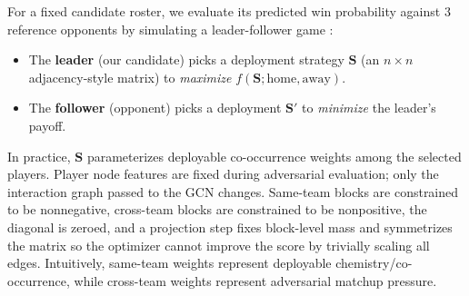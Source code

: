 \documentclass[11pt,letterpaper]{article}
\begin{document}
For a fixed candidate roster, we evaluate its predicted win probability
against $3$ reference opponents by simulating a leader-follower game
\citep{conitzer2006commit}:

\begin{itemize}[leftmargin=*]
  \item The \textbf{leader} (our candidate) picks a deployment strategy
    $\mathbf{S}$ (an $n \times n$ adjacency-style matrix) to
    \emph{maximize} $f(\mathbf{S}; \text{home}, \text{away})$.
  \item The \textbf{follower} (opponent) picks a deployment
    $\mathbf{S}'$ to \emph{minimize} the leader's payoff.
\end{itemize}

In practice, $\mathbf{S}$ parameterizes deployable co-occurrence
weights among the selected players. Player node features are fixed
during adversarial evaluation; only the interaction graph passed to the
GCN changes. Same-team blocks are constrained to be nonnegative,
cross-team blocks are constrained to be nonpositive, the diagonal is
zeroed, and a projection step fixes block-level mass and symmetrizes the
matrix so the optimizer cannot improve the score by trivially scaling
all edges.
Intuitively, same-team weights represent deployable
chemistry/co-occurrence, while cross-team weights represent adversarial
matchup pressure.
\end{document}
